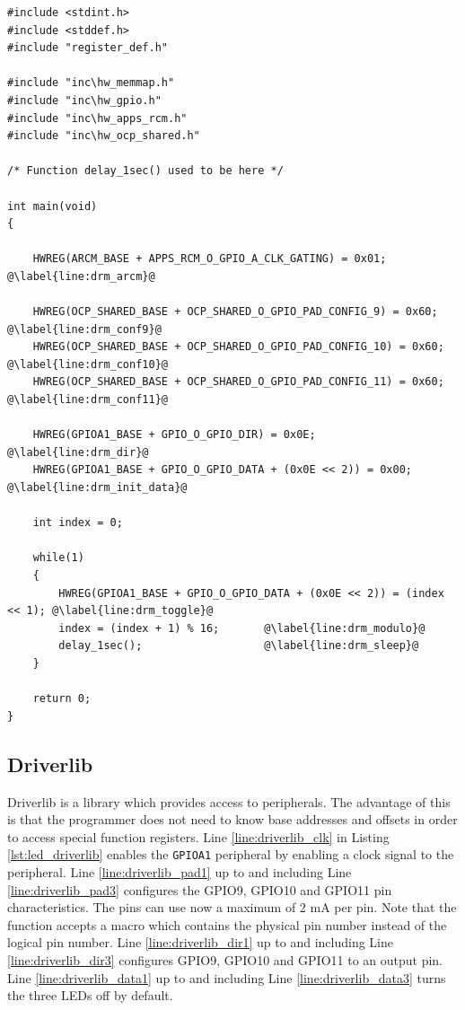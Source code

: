 \begin{lstlisting}[style=CStyle, caption={Toggling LEDs according to Table \ref{tab:led_scheme} using DRM programming technique}, captionpos=b, label={lst:led_drm}, escapechar=@]
#include <stdint.h>
#include <stddef.h>
#include "register_def.h"
 
#include "inc\hw_memmap.h"
#include "inc\hw_gpio.h"
#include "inc\hw_apps_rcm.h"
#include "inc\hw_ocp_shared.h"
 
/* Function delay_1sec() used to be here */

int main(void)
{
 
    HWREG(ARCM_BASE + APPS_RCM_O_GPIO_A_CLK_GATING) = 0x01; @\label{line:drm_arcm}@
 
    HWREG(OCP_SHARED_BASE + OCP_SHARED_O_GPIO_PAD_CONFIG_9) = 0x60; @\label{line:drm_conf9}@
    HWREG(OCP_SHARED_BASE + OCP_SHARED_O_GPIO_PAD_CONFIG_10) = 0x60; @\label{line:drm_conf10}@
    HWREG(OCP_SHARED_BASE + OCP_SHARED_O_GPIO_PAD_CONFIG_11) = 0x60; @\label{line:drm_conf11}@
 
    HWREG(GPIOA1_BASE + GPIO_O_GPIO_DIR) = 0x0E;    @\label{line:drm_dir}@
    HWREG(GPIOA1_BASE + GPIO_O_GPIO_DATA + (0x0E << 2)) = 0x00; @\label{line:drm_init_data}@
 
    int index = 0;
 
    while(1)
    {
        HWREG(GPIOA1_BASE + GPIO_O_GPIO_DATA + (0x0E << 2)) = (index << 1); @\label{line:drm_toggle}@
        index = (index + 1) % 16;       @\label{line:drm_modulo}@
        delay_1sec();                   @\label{line:drm_sleep}@
    }
 
    return 0;
}
\end{lstlisting}


\newpage
\subsection{Driverlib}

Driverlib is a library which provides access to peripherals.
The advantage of this is that the programmer does not need to know base addresses and offsets in order to access special function registers.
Line \ref{line:driverlib_clk} in Listing \ref{lst:led_driverlib} enables the \texttt{GPIOA1} peripheral by enabling a clock signal to the peripheral.
Line \ref{line:driverlib_pad1} up to and including Line \ref{line:driverlib_pad3} configures the GPIO9, GPIO10 and GPIO11 pin characteristics. The pins can use now a maximum of 2 mA per pin.
Note that the function accepts a macro which contains the physical pin number instead of the logical pin number.
Line \ref{line:driverlib_dir1} up to and including Line \ref{line:driverlib_dir3} configures GPIO9, GPIO10 and GPIO11 to an output pin.
Line \ref{line:driverlib_data1} up to and including Line \ref{line:driverlib_data3} turns the three LEDs off by default.

